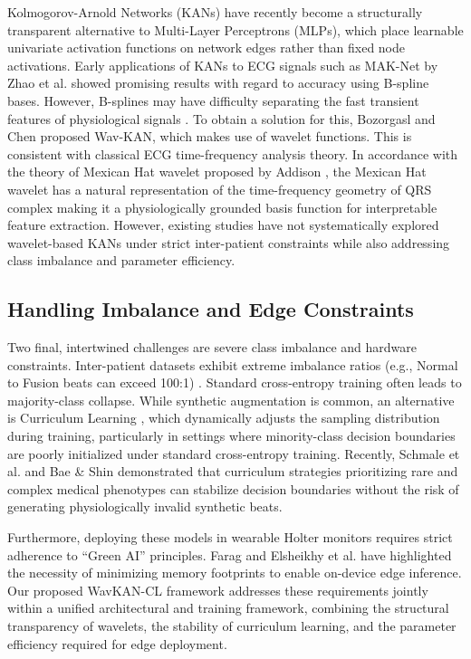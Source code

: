 \documentclass[pdflatex,sn-mathphys-num]{sn-jnl}
\theoremstyle{thmstyleone}
\theoremstyle{thmstyletwo}
\theoremstyle{thmstylethree}
\begin{document}
Kolmogorov-Arnold Networks (KANs) \cite{liu_kan_2024} have recently become a structurally transparent alternative to Multi-Layer Perceptrons (MLPs), which place learnable univariate activation functions on network edges rather than fixed node activations. Early applications of KANs to ECG signals such as MAK-Net by Zhao et al. \cite{zhao_mak-net_2025} showed promising results with regard to accuracy using B-spline bases. However, B-splines may have difficulty separating the fast transient features of physiological signals \cite{bozorgasl_liu_2024}. To obtain a solution for this, Bozorgasl and Chen \cite{bozorgasl_liu_2024} proposed Wav-KAN, which makes use of wavelet functions. This is consistent with classical ECG time-frequency analysis theory. In accordance with the theory of Mexican Hat wavelet proposed by Addison \cite{addison_wavelet_2005}, the Mexican Hat wavelet has a natural representation of the time-frequency geometry of QRS complex making it a physiologically grounded basis function for interpretable feature extraction. However, existing studies have not systematically explored wavelet-based KANs under strict inter-patient constraints while also addressing class imbalance and parameter efficiency.

\subsection{Handling Imbalance and Edge Constraints}
Two final, intertwined challenges are severe class imbalance and hardware constraints. Inter-patient datasets exhibit extreme imbalance ratios (e.g., Normal to Fusion beats can exceed 100:1) \cite{silva_systematic_2025}. Standard cross-entropy training often leads to majority-class collapse. While synthetic augmentation is common, an alternative is Curriculum Learning \cite{bengio_curriculum_2009}, which dynamically adjusts the sampling distribution during training, particularly in settings where minority-class decision boundaries are poorly initialized under standard cross-entropy training. Recently, Schmale et al. \cite{schmale_curriculum_2025} and Bae \& Shin \cite{bae_handling_2025} demonstrated that curriculum strategies prioritizing rare and complex medical phenotypes can stabilize decision boundaries without the risk of generating physiologically invalid synthetic beats.

Furthermore, deploying these models in wearable Holter monitors requires strict adherence to ``Green AI'' principles. Farag \cite{farag_tiny_2023} and Elsheikhy et al. \cite{elsheikhy_lightweight_2025} have highlighted the necessity of minimizing memory footprints to enable on-device edge inference. Our proposed WavKAN-CL framework addresses these requirements jointly within a unified architectural and training framework, combining the structural transparency of wavelets, the stability of curriculum learning, and the parameter efficiency required for edge deployment.
\end{document}
